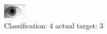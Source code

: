 \begin{figure}[h!]
\begin{center}
\includegraphics[width=0.60\columnwidth]{figures/ID1934_class_4_target_3.png}
\end{center}
\caption{ Classification: 4 actual target: 3}
\label{fig:ID1934_class_4_target_3}
\end{figure}
